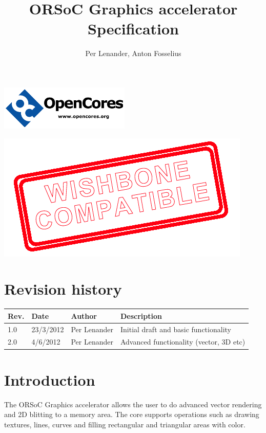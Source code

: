 \documentclass[10pt,a4paper]{article}
\author{Per Lenander, Anton Fosselius}
\title{ORSoC Graphics accelerator Specification}
\begin{document}
\maketitle

\begin{center}
\includegraphics[scale=1.0]{../pictures/OpenCores}
\end{center}

\begin{center}
\includegraphics[scale=0.50]{../pictures/wb_compatible}
\end{center}

\newpage

\section*{Revision history}
\begin{tabular}{|p{1cm}|p{2cm}|p{3cm}|p{7cm}|}
\hline \textbf{Rev.} & \textbf{Date} & \textbf{Author} & \textbf{Description} \\
\hline 
\hline 1.0 & 23/3/2012 & Per Lenander & Initial draft and basic functionality \\
\hline 2.0 & 4/6/2012 & Per Lenander & Advanced functionality (vector, 3D etc) \\
\hline 
\end{tabular} 
\newpage

\tableofcontents
\newpage

\section{Introduction}
The ORSoC Graphics accelerator allows the user to do advanced vector rendering and 2D blitting to a memory area. The core supports operations such as drawing textures, lines, curves and filling rectangular and triangular areas with color.
\end{document}
